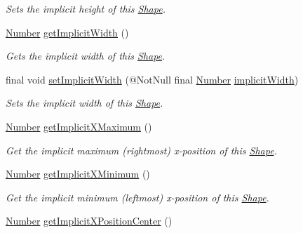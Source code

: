 \begin{DoxyCompactItemize}
\begin{DoxyCompactList}\small\item\em Sets the implicit height of this \hyperlink{classcom_1_1aarrelaakso_1_1drawl_1_1_shape}{Shape}. \end{DoxyCompactList}\item 
\hyperlink{interfacecom_1_1aarrelaakso_1_1drawl_1_1_number}{Number} \hyperlink{classcom_1_1aarrelaakso_1_1drawl_1_1_shape_af8182545b3b1c85ecaee849474f63c6b}{get\+Implicit\+Width} ()
\begin{DoxyCompactList}\small\item\em Gets the implicit width of this \hyperlink{classcom_1_1aarrelaakso_1_1drawl_1_1_shape}{Shape}. \end{DoxyCompactList}\item 
final void \hyperlink{classcom_1_1aarrelaakso_1_1drawl_1_1_shape_acc3e365064b5d4f719ac920a5a70aedb}{set\+Implicit\+Width} (@Not\+Null final \hyperlink{interfacecom_1_1aarrelaakso_1_1drawl_1_1_number}{Number} \hyperlink{classcom_1_1aarrelaakso_1_1drawl_1_1_shape_a06c9063aa0b51139910e23414428c9d6}{implicit\+Width})
\begin{DoxyCompactList}\small\item\em Sets the implicit width of this \hyperlink{classcom_1_1aarrelaakso_1_1drawl_1_1_shape}{Shape}. \end{DoxyCompactList}\item 
\hyperlink{interfacecom_1_1aarrelaakso_1_1drawl_1_1_number}{Number} \hyperlink{classcom_1_1aarrelaakso_1_1drawl_1_1_shape_a0903079fd35e3cfdd6cdc299548a9680}{get\+Implicit\+X\+Maximum} ()
\begin{DoxyCompactList}\small\item\em Get the implicit maximum (rightmost) x-\/position of this \hyperlink{classcom_1_1aarrelaakso_1_1drawl_1_1_shape}{Shape}. \end{DoxyCompactList}\item 
\hyperlink{interfacecom_1_1aarrelaakso_1_1drawl_1_1_number}{Number} \hyperlink{classcom_1_1aarrelaakso_1_1drawl_1_1_shape_a264da8a94218b09267c2e177ff0b0951}{get\+Implicit\+X\+Minimum} ()
\begin{DoxyCompactList}\small\item\em Get the implicit minimum (leftmost) x-\/position of this \hyperlink{classcom_1_1aarrelaakso_1_1drawl_1_1_shape}{Shape}. \end{DoxyCompactList}\item 
\hyperlink{interfacecom_1_1aarrelaakso_1_1drawl_1_1_number}{Number} \hyperlink{classcom_1_1aarrelaakso_1_1drawl_1_1_shape_a9632097be62eb03e09145763852bda85}{get\+Implicit\+X\+Position\+Center} ()

\end{DoxyCompactItemize}
